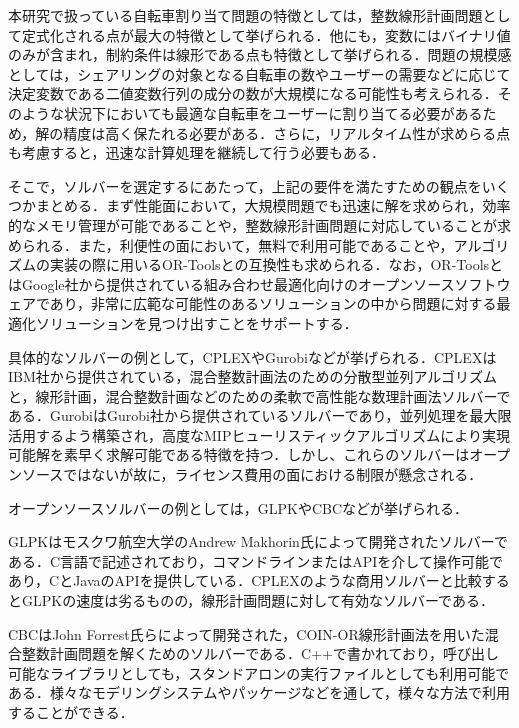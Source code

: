           \par 本研究で扱っている自転車割り当て問題の特徴としては，整数線形計画問題として定式化される点が最大の特徴として挙げられる．他にも，変数にはバイナリ値のみが含まれ，制約条件は線形である点も特徴として挙げられる．問題の規模感としては，シェアリングの対象となる自転車の数やユーザーの需要などに応じて決定変数である二値変数行列の成分の数が大規模になる可能性も考えられる．そのような状況下においても最適な自転車をユーザーに割り当てる必要があるため，解の精度は高く保たれる必要がある．さらに，リアルタイム性が求めらる点も考慮すると，迅速な計算処理を継続して行う必要もある．
          
          \par そこで，ソルバーを選定するにあたって，上記の要件を満たすための観点をいくつかまとめる．まず性能面において，大規模問題でも迅速に解を求められ，効率的なメモリ管理が可能であることや，整数線形計画問題に対応していることが求められる．また，利便性の面において，無料で利用可能であることや，アルゴリズムの実装の際に用いるOR-Toolsとの互換性も求められる．なお，OR-ToolsとはGoogle社から提供されている組み合わせ最適化向けのオープンソースソフトウェアであり，非常に広範な可能性のあるソリューションの中から問題に対する最適化ソリューションを見つけ出すことをサポートする\cite{OR-Tools}．
          
          \par 具体的なソルバーの例として，CPLEXやGurobiなどが挙げられる．CPLEXはIBM社から提供されている，混合整数計画法のための分散型並列アルゴリズムと，線形計画，混合整数計画などのための柔軟で高性能な数理計画法ソルバーである\cite{CPLEX}．GurobiはGurobi社から提供されているソルバーであり，並列処理を最大限活用するよう構築され，高度なMIPヒューリスティックアルゴリズムにより実現可能解を素早く求解可能である特徴を持つ\cite{Gurobi}．しかし、これらのソルバーはオープンソースではないが故に，ライセンス費用の面における制限が懸念される．
          
          \par オープンソースソルバーの例としては，GLPKやCBCなどが挙げられる．
          
          \par GLPKはモスクワ航空大学のAndrew Makhorin氏によって開発されたソルバーである．C言語で記述されており，コマンドラインまたはAPIを介して操作可能であり，CとJavaのAPIを提供している．CPLEXのような商用ソルバーと比較するとGLPKの速度は劣るものの，線形計画問題に対して有効なソルバーである\cite{gearhart2013comparison}．
          
          \par CBCはJohn Forrest氏らによって開発された，COIN-OR線形計画法を用いた混合整数計画問題を解くためのソルバーである．C++で書かれており，呼び出し可能なライブラリとしても，スタンドアロンの実行ファイルとしても利用可能である．様々なモデリングシステムやパッケージなどを通して，様々な方法で利用することができる\cite{CBC}．
          
